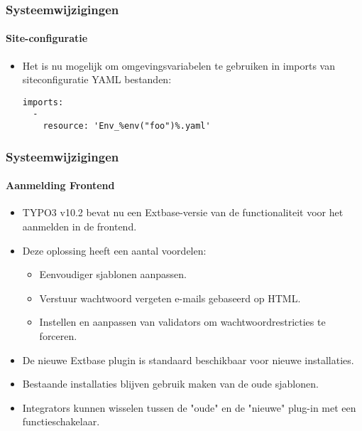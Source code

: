 
\begin{frame}[fragile]
	\frametitle{Systeemwijzigingen}
	\framesubtitle{Site-configuratie}

	\lstset{basicstyle=\tiny\ttfamily}

	\begin{itemize}

		\item Het is nu mogelijk om omgevingsvariabelen te gebruiken in imports van siteconfiguratie YAML bestanden:
\begin{lstlisting}
imports:
  -
    resource: 'Env_%env("foo")%.yaml'
\end{lstlisting}

	\end{itemize}

\end{frame}


\begin{frame}[fragile]
	\frametitle{Systeemwijzigingen}
	\framesubtitle{Aanmelding Frontend}

	\begin{itemize}

		\item TYPO3 v10.2 bevat nu een Extbase-versie van de functionaliteit voor het aanmelden in de frontend.
		\item Deze oplossing heeft een aantal voordelen:

			\begin{itemize}
				\item Eenvoudiger sjablonen aanpassen.
				\item Verstuur wachtwoord vergeten e-mails gebaseerd op HTML.
				\item Instellen en aanpassen van validators om wachtwoordrestricties te forceren.
			\end{itemize}

		\item De nieuwe Extbase plugin is standaard beschikbaar voor nieuwe installaties.
		\item Bestaande installaties blijven gebruik maken van de oude sjablonen.
		\item Integrators kunnen wisselen tussen de "oude" en de "nieuwe" plug-in met een functieschakelaar.

	\end{itemize}

\end{frame}

